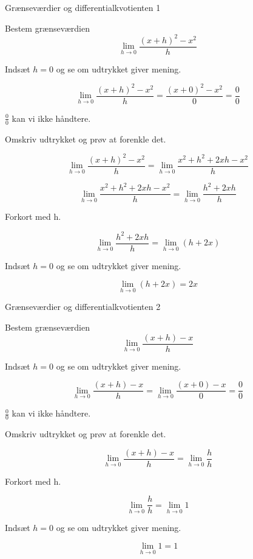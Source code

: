 \documentclass{article}
\begin{document}
\tableofcontents
\newpage

\begin{exercise}{Grænseværdier og differentialkvotienten 1}

Bestem grænseværdien
\[
\lim_{h \to 0} \frac{(x + h)^2 - x^2}{h}
\]


\hint
Indsæt $h=0$ og se om udtrykket giver mening.

\hint
\[
\lim_{h \to 0} \frac{(x + h)^2 - x^2}{h} = \frac{(x + 0)^2 - x^2}{0} = \frac{0}{0}
\]

\hint
$\frac{0}{0}$ kan vi ikke håndtere.

\hint
Omskriv udtrykket og prøv at forenkle det.

\hint
\[
\lim_{h \to 0} \frac{(x + h)^2 - x^2}{h} = \lim_{h \to 0} \frac{x^2 + h^2 + 2xh - x^2}{h}
\]

\hint
\[
\lim_{h \to 0} \frac{x^2 + h^2 + 2xh - x^2}{h} = \lim_{h \to 0} \frac{h^2 + 2xh}{h}
\]

\hint
Forkort med h.

\hint
\[
\lim_{h \to 0} \frac{h^2 + 2xh}{h} = \lim_{h \to 0} (h + 2x)
\]

\hint
Indsæt $h=0$ og se om udtrykket giver mening.

\hint
\[
\lim_{h \to 0} (h + 2x) = 2x
\]

\end{exercise}

\newpage
\begin{exercise}{Grænseværdier og differentialkvotienten 2}

Bestem grænseværdien
\[
\lim_{h \to 0} \frac{(x + h)-x}{h}
\]


\hint
Indsæt $h=0$ og se om udtrykket giver mening.

\hint
\[
\lim_{h \to 0} \frac{(x + h)-x}{h} =\lim_{h \to 0} \frac{(x + 0)-x}{0} = \frac{0}{0}
\]

\hint
$\frac{0}{0}$ kan vi ikke håndtere.

\hint
Omskriv udtrykket og prøv at forenkle det.

\hint
\[
\lim_{h \to 0} \frac{(x + h)-x}{h} = \lim_{h \to 0} \frac{h}{h}
\]

\hint
Forkort med h.

\hint
\[
\lim_{h \to 0} \frac{h}{h} = \lim_{h \to 0} 1
\]

\hint
Indsæt $h=0$ og se om udtrykket giver mening.

\hint
\[
\lim_{h \to 0} 1 = 1
\]

\end{exercise}
\end{document}
